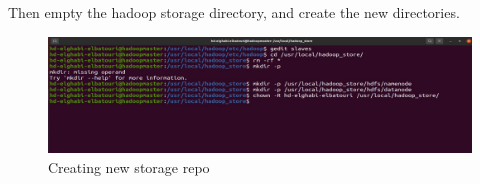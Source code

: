 \begin{spacing}{1.2}
\par Then empty the hadoop storage directory, and create the new directories.
\\
\begin{figure}[!htb] 
\begin{center} 
\includegraphics[width=1\linewidth]{Big_Data/Hadoop/Multi-Nodes Cluster/Creating new storage repo} 
\end{center} 
\caption{Creating new storage repo} 
\end{figure} 
\FloatBarrier
\end{spacing}